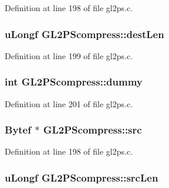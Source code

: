 Definition at line 198 of file gl2ps.\+c.

\hypertarget{struct_g_l2_p_scompress_abe61bed6b88386094c626710bfa6e42d}{}
\subsubsection[{dest\+Len}]{\setlength{\rightskip}{0pt plus 5cm}u\+Longf G\+L2\+P\+Scompress\+::dest\+Len}\label{struct_g_l2_p_scompress_abe61bed6b88386094c626710bfa6e42d}


Definition at line 199 of file gl2ps.\+c.

\hypertarget{struct_g_l2_p_scompress_ac05cb9cfb6af433cd4f7bd9005345df3}{}
\subsubsection[{dummy}]{\setlength{\rightskip}{0pt plus 5cm}int G\+L2\+P\+Scompress\+::dummy}\label{struct_g_l2_p_scompress_ac05cb9cfb6af433cd4f7bd9005345df3}


Definition at line 201 of file gl2ps.\+c.

\hypertarget{struct_g_l2_p_scompress_a82320ed62be91ea1f1a8b92711912f0e}{}
\subsubsection[{src}]{\setlength{\rightskip}{0pt plus 5cm}Bytef $\ast$ G\+L2\+P\+Scompress\+::src}\label{struct_g_l2_p_scompress_a82320ed62be91ea1f1a8b92711912f0e}


Definition at line 198 of file gl2ps.\+c.

\hypertarget{struct_g_l2_p_scompress_a04d79912255b3de2b651400d461c946b}{}
\subsubsection[{src\+Len}]{\setlength{\rightskip}{0pt plus 5cm}u\+Longf G\+L2\+P\+Scompress\+::src\+Len}\label{struct_g_l2_p_scompress_a04d79912255b3de2b651400d461c946b}


